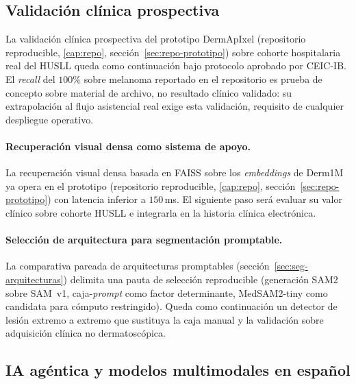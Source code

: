 \subsection{Validación clínica prospectiva}
\label{sec:linea-prospectivo}

La validación clínica prospectiva del prototipo DermApIxel
(repositorio reproducible, \ref{cap:repo},
sección~\ref{sec:repo-prototipo}) sobre cohorte hospitalaria real del
HUSLL queda como continuación bajo protocolo aprobado por CEIC-IB. El
\emph{recall} del $100\%$ sobre melanoma reportado en el repositorio es
prueba de concepto sobre material de archivo, no resultado clínico
validado: su extrapolación al flujo asistencial real exige esta
validación, requisito de cualquier despliegue operativo.

\paragraph{Recuperación visual densa como sistema de apoyo.}
\label{sec:linea-rag}
La recuperación visual densa basada en FAISS sobre los \emph{embeddings}
de Derm1M ya opera en el prototipo
(repositorio reproducible, \ref{cap:repo},
sección~\ref{sec:repo-prototipo}) con latencia inferior a $150$\,ms. El
siguiente paso será evaluar su valor clínico sobre cohorte HUSLL e
integrarla en la historia clínica electrónica.

\paragraph{Selección de arquitectura para segmentación promptable.}
\label{sec:linea-seg-arquitectura}
La comparativa pareada de arquitecturas promptables
(sección~\ref{sec:seg-arquitecturas}) delimita una pauta de selección
reproducible (generación SAM2 sobre SAM~v1, caja-\emph{prompt} como factor
determinante, MedSAM2-tiny como candidata para cómputo restringido).
Queda como continuación un detector de lesión extremo a extremo que
sustituya la caja manual y la validación sobre adquisición clínica no
dermatoscópica.

\subsection{IA agéntica y modelos multimodales en español}
\label{sec:linea-agentica}

